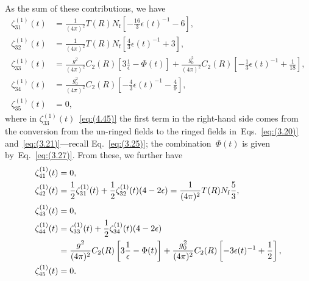 %
As the sum of these contributions, we have
\begin{align}
   \zeta_{31}^{(1)}(t)
   &=\frac{1}{(4\pi)^2}T(R)N_{\mathrm{f}}
   \left[-\frac{16}{3}\epsilon(t)^{-1}-6\right],
\label{eq:(4.43)}\\
   \zeta_{32}^{(1)}(t)
   &=\frac{1}{(4\pi)^2}T(R)N_{\mathrm{f}}
   \left[\frac{4}{3}\epsilon(t)^{-1}+3\right],
\label{eq:(4.44)}\\
   \zeta_{33}^{(1)}(t)
   &=\frac{g^2}{(4\pi)^2}C_2(R)
   \left[3\frac{1}{\epsilon}-\Phi(t)\right]
   +\frac{g_0^2}{(4\pi)^2}C_2(R)
   \left[-\frac{1}{3}\epsilon(t)^{-1}+\frac{1}{18}\right],
\label{eq:(4.45)}\\
   \zeta_{34}^{(1)}(t)
   &=\frac{g_0^2}{(4\pi)^2}C_2(R)
   \left[-\frac{4}{3}\epsilon(t)^{-1}-\frac{4}{9}\right],
\label{eq:(4.46)}\\
   \zeta_{35}^{(1)}(t)
   &=0,
\label{eq:(4.47)}
\end{align}
where in $\zeta_{33}^{(1)}(t)$~\eqref{eq:(4.45)} the first term in the
right-hand side comes from the conversion from the un-ringed fields to the
ringed fields in~Eqs.~\eqref{eq:(3.20)} and~\eqref{eq:(3.21)}---recall
Eq.~\eqref{eq:(3.25)}; the combination~$\Phi(t)$ is given
by~Eq.~\eqref{eq:(3.27)}. From these, we further have
\begin{align}
   \zeta_{41}^{(1)}(t)
   &=0,
\label{eq:(4.48)}\\
   \zeta_{42}^{(1)}(t)
   &=\frac{1}{2}\zeta_{31}^{(1)}(t)+\frac{1}{2}\zeta_{32}^{(1)}(t)(4-2\epsilon)
   =\frac{1}{(4\pi)^2}T(R)N_{\mathrm{f}}
   \frac{5}{3},
\label{eq:(4.49)}\\
   \zeta_{43}^{(1)}(t)
   &=0,
\label{eq:(4.50)}\\
   \zeta_{44}^{(1)}(t)
   &=\zeta_{33}^{(1)}(t)+\frac{1}{2}\zeta_{34}^{(1)}(t)(4-2\epsilon)
\notag\\
   &=\frac{g^2}{(4\pi)^2}C_2(R)
   \left[3\frac{1}{\epsilon}-\Phi(t)\right]
   +\frac{g_0^2}{(4\pi)^2}C_2(R)
   \left[-3\epsilon(t)^{-1}+\frac{1}{2}\right],
\label{eq:(4.51)}\\
   \zeta_{45}^{(1)}(t)
   &=0.
\label{eq:(4.52)}
\end{align}

